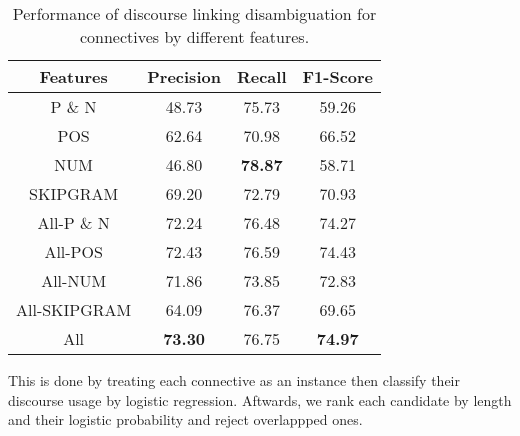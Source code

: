 \begin{table}[ht]
\centering
\begin{tabular}{|c|c|c|c|}
\hline

\bf Features            & \bf Precision & \bf Recall & \bf F1-Score \\ \hline
    P \& N              &     48.73     &     75.73  &     59.26    \\ \hline
    POS                 &     62.64     &     70.98  &     66.52    \\ \hline
    NUM                 &     46.80     & \bf 78.87  &     58.71    \\ \hline
    SKIPGRAM            &     69.20     &     72.79  &     70.93    \\ \hline
    All-P \& N          &     72.24     &     76.48  &     74.27    \\ \hline
    All-POS             &     72.43     &     76.59  &     74.43    \\ \hline
    All-NUM             &     71.86     &     73.85  &     72.83    \\ \hline
    All-SKIPGRAM        &     64.09     &     76.37  &     69.65    \\ \hline
    All                 & \bf 73.30     &     76.75  & \bf 74.97    \\ \hline


\end{tabular}
\caption{\label{t:classify-features} Performance of discourse linking
disambiguation for connectives by different features.} This is done by
treating each connective as an instance then classify their discourse usage
by logistic regression. Aftwards, we rank each candidate by length and their
logistic probability and reject overlappped ones.
\end{table}

